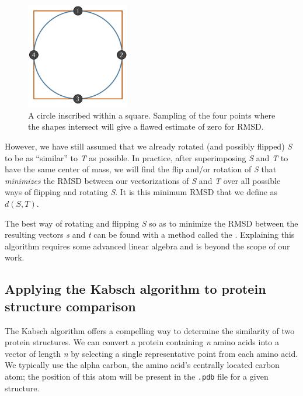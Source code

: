 \begin{figure}[h]
	\centering
	\mySfFamily
	\includegraphics[width = 0.4\textwidth]{../images/circle_square_undersampling.png}
	\caption{A circle inscribed within a square. Sampling of the four points where the shapes intersect will give a flawed estimate of zero for RMSD.}
	\label{fig:circle_square_undersampling}
\end{figure}

However, we have still assumed that we already rotated (and possibly flipped) \textit{S} to be as ``similar'' to \textit{T} as possible. In practice, after superimposing \textit{S} and \textit{T} to have the same center of mass, we will find the flip and/or rotation of \textit{S} that \textit{minimizes} the RMSD between our vectorizations of \textit{S} and \textit{T} over all possible ways of flipping and rotating \textit{S}. It is this minimum RMSD that we define as $d(S, T)$.

The best way of rotating and flipping \textit{S} so as to minimize the RMSD between the resulting vectors \textit{s} and \textit{t} can be found with a method called the . Explaining this algorithm requires some advanced linear algebra and is beyond the scope of our work.

\FloatBarrier
{}
\subsection{Applying the Kabsch algorithm to protein structure comparison}

The Kabsch algorithm offers a compelling way to determine the similarity of two protein structures. We can convert a protein containing \textit{n} amino acids into a vector of length \textit{n} by selecting a single representative point from each amino acid. We typically use the alpha carbon, the amino acid's centrally located carbon atom; the position of this atom will be present in the \texttt{.pdb} file for a given structure.\\

